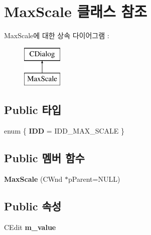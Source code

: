 \hypertarget{class_max_scale}{}\section{Max\+Scale 클래스 참조}
\label{class_max_scale}
Max\+Scale에 대한 상속 다이어그램 \+: \begin{figure}[H]
\begin{center}
\leavevmode
\includegraphics[height=2.000000cm]{class_max_scale}
\end{center}
\end{figure}
\subsection*{Public 타입}
\begin{DoxyCompactItemize}
\item 
\mbox{\label{class_max_scale_a2584d0e001acfcc3d5381fcfa28802d1}} 
enum \{ {\bfseries I\+DD} = I\+D\+D\+\_\+\+M\+A\+X\+\_\+\+S\+C\+A\+LE
 \}
\end{DoxyCompactItemize}
\subsection*{Public 멤버 함수}
\begin{DoxyCompactItemize}
\item 
\mbox{\label{class_max_scale_ac641f139272a4259f94f058bfeffa502}} 
{\bfseries Max\+Scale} (C\+Wnd $\ast$p\+Parent=N\+U\+LL)
\end{DoxyCompactItemize}
\subsection*{Public 속성}
\begin{DoxyCompactItemize}
\item 
\mbox{\label{class_max_scale_a95c50937477be6af50f60f022b5fd4f8}} 
C\+Edit {\bfseries m\+\_\+value}
\end{DoxyCompactItemize}
